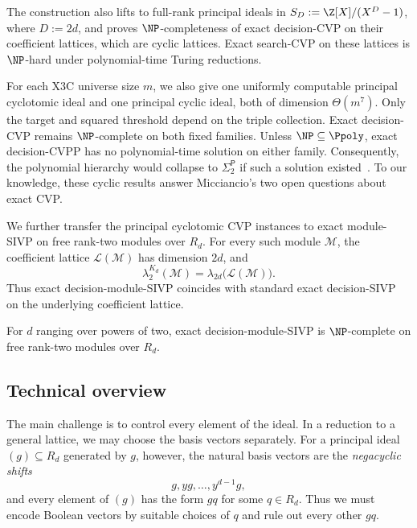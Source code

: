 The construction also lifts to full-rank principal ideals in
\(S_D\mathrel{:=}\Z[X]/(X^D-1)\), where
\(D\mathrel{:=}2d\), and proves \(\NP\)-completeness of
exact decision-CVP on their coefficient lattices, which are cyclic
lattices.  Exact search-CVP on these
lattices is \(\NP\)-hard under polynomial-time Turing reductions.

For each X3C universe size \(m\), we also give one uniformly
computable principal cyclotomic ideal and one principal cyclic ideal, both of
dimension \(\Theta(m^7)\).  Only the target and squared
threshold depend on the triple collection.  Exact decision-CVP remains
\(\NP\)-complete on both fixed families.
Unless \(\NP\subseteq\Ppoly\), exact decision-CVPP has no
polynomial-time solution on either family.  Consequently, the polynomial
hierarchy would collapse to \(\Sigma_2^{\mathsf P}\) if such a solution
existed~\cite{KarpLipton1980}.  To our knowledge, these
cyclic results answer Micciancio's two open questions about exact CVP.

\ifdefined\withModuleSIVP
We further transfer the principal cyclotomic CVP instances to exact
module-SIVP on free rank-two modules over \(R_d\).
{For every such module \(\mathcal M\), the coefficient lattice
\(\mathcal L(\mathcal M)\) has dimension \(2d\), and}
\[
 {
 \lambda_2^{K_d}(\mathcal M)
 =\lambda_{2d}\bigl(\mathcal L(\mathcal M)\bigr).
 }
\]
Thus exact decision-module-SIVP coincides with standard exact
decision-SIVP on the underlying coefficient lattice.

\begin{theorem}
\label{thm:intro-module-sivp}
For \(d\) ranging over powers of two, exact decision-module-SIVP is
\(\NP\)-complete on free rank-two modules over \(R_d\).
\end{theorem}
\fi

\subsection{Technical overview}
\label{sec:intro-overview}

The main challenge is to control every element of the ideal.
In a reduction to a general lattice, we may choose the basis vectors
separately.  For a principal ideal \((g)\subseteq R_d\)
generated by \(g\), however, the natural basis vectors are
the \emph{negacyclic shifts}
\[
 g,yg,\ldots,y^{d-1}g,
\]
and every element of \((g)\) has the form \(gq\) for some
\(q\in R_d\).  Thus we must encode Boolean vectors by suitable choices of
\(q\) and rule out every other \(gq\).

